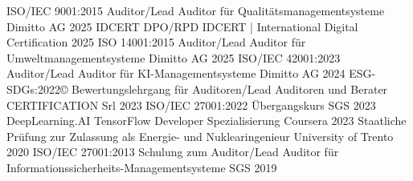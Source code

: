 
\begin{cvhonors}

\cvhonor
{ISO/IEC 9001:2015 Auditor/Lead Auditor für Qualitätsmanagementsysteme}
{}
{Dimitto AG}
{2025}
\cvhonor
{IDCERT DPO/RPD}
{}
{IDCERT | International Digital Certification}
{2025}
\cvhonor
{ISO 14001:2015 Auditor/Lead Auditor für Umweltmanagementsysteme}
{}
{Dimitto AG}
{2025}
\cvhonor
{ISO/IEC 42001:2023 Auditor/Lead Auditor für KI-Managementsysteme}
{}
{Dimitto AG}
{2024}
\cvhonor
{ESG-SDGs:2022© Bewertungslehrgang für Auditoren/Lead Auditoren und Berater}
{}
{CERTIFICATION Srl}
{2023}
\cvhonor
{ISO/IEC 27001:2022 Übergangskurs}
{}
{SGS}
{2023}
\cvhonor
{DeepLearning.AI TensorFlow Developer Spezialisierung}
{}
{Coursera}
{2023}
\cvhonor
{Staatliche Prüfung zur Zulassung als Energie- und Nuklearingenieur}
{}
{University of Trento}
{2020}
\cvhonor
{ISO/IEC 27001:2013 Schulung zum Auditor/Lead Auditor für Informationssicherheits-Managementsysteme}
{}
{SGS}
{2019}
\end{cvhonors}